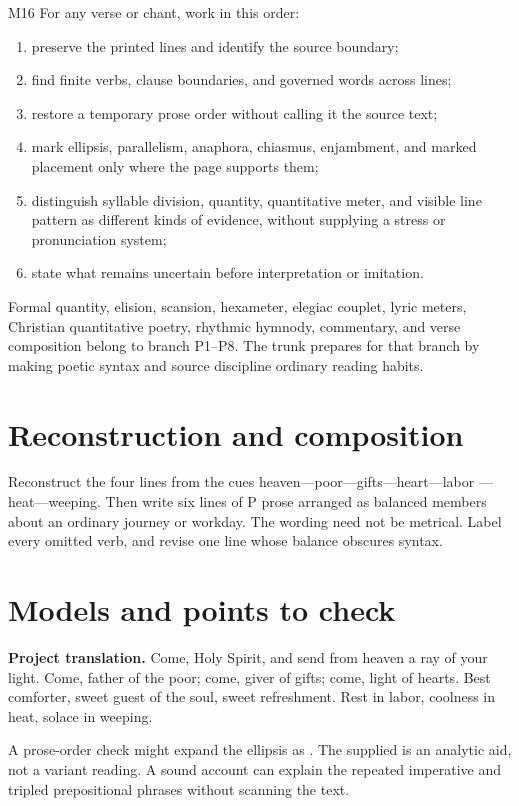 \begin{courseunit}{M16}
For any verse or chant, work in this order:

\begin{enumerate}
\item preserve the printed lines and identify the source boundary;
\item find finite verbs, clause boundaries, and governed words across lines;
\item restore a temporary prose order without calling it the source text;
\item mark ellipsis, parallelism, anaphora, chiasmus, enjambment, and marked
placement only where the page supports them;
\item distinguish syllable division, quantity, quantitative meter, and visible
line pattern as different kinds of evidence, without supplying a stress or
pronunciation system;
\item state what remains uncertain before interpretation or imitation.
\end{enumerate}

Formal quantity, elision, scansion, hexameter, elegiac couplet, lyric meters,
Christian quantitative poetry, rhythmic hymnody, commentary, and verse
composition belong to branch P1--P8.  The trunk prepares for that branch by
making poetic syntax and source discipline ordinary reading habits.

\section{Reconstruction and composition}

Reconstruct the four lines from the cues heaven---poor---gifts---heart---labor
---heat---weeping.  Then write six lines of P prose arranged as balanced
members about an ordinary journey or workday.  The wording need not be metrical.
Label every omitted verb, and revise one line whose balance obscures syntax.

\ifsolutions
\section{Models and points to check}
\textbf{Project translation.} Come, Holy Spirit, and send from heaven a ray of
your light. Come, father of the poor; come, giver of gifts; come, light of
hearts. Best comforter, sweet guest of the soul, sweet refreshment. Rest in
labor, coolness in heat, solace in weeping.

A prose-order check might expand the ellipsis as .  The supplied  is an
analytic aid, not a variant reading.  A sound account can explain the repeated
imperative and tripled prepositional phrases without scanning the text.
\else

\end{courseunit}
